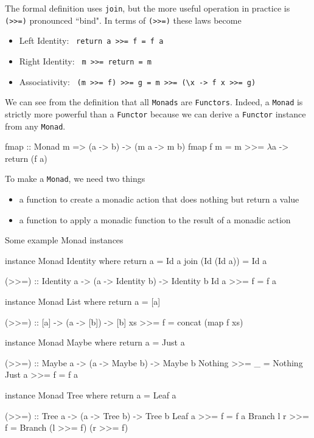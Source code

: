 \documentclass[12pt]{article}
\begin{document}
The formal definition uses \texttt{join}, but the more useful operation in practice is
\texttt{(>>=)} pronounced ``bind". In terms of \texttt{(>>=)} these laws become
\begin{itemize}
    \item{Left Identity: \lstinline $ return a >>= f = f a $}
    \item{Right Identity: \lstinline $ m >>= return = m $}
    \item{Associativity: \lstinline $ (m >>= f) >>= g = m >>= (\x -> f x >>= g) $}
\end{itemize}

We can see from the definition that all \texttt{Monads} are \texttt{Functors}.
Indeed, a \texttt{Monad} is strictly more powerful than a \texttt{Functor} because
we can derive a \texttt{Functor} instance from any \texttt{Monad}.
\begin{haskell}
fmap :: Monad m => (a -> b) -> (m a -> m b)
fmap f m = m >>= $\lambda$a -> return (f a)
\end{haskell}
\newpage

To make a \texttt{Monad}, we need two things
\begin{itemize}
    \item{a function to create a monadic action that does nothing but return a value}
    \item{a function to apply a monadic function to the result of a monadic action}
\end{itemize}

Some example Monad instances
\begin{haskell}
instance Monad Identity where
    return a = Id a
    join (Id (Id a)) = Id a

    (>>=) :: Identity a -> (a -> Identity b) -> Identity b
    Id a >>= f = f a

instance Monad List where
    return a = [a]

    (>>=) :: [a] -> (a -> [b]) -> [b]
    xs >>= f = concat (map f xs)

instance Monad Maybe where
    return a = Just a

    (>>=) :: Maybe a -> (a -> Maybe b) -> Maybe b
    Nothing >>= _ = Nothing
    Just a  >>= f = f a

instance Monad Tree where
    return a = Leaf a

    (>>=) :: Tree a -> (a -> Tree b) -> Tree b
    Leaf a >>= f = f a
    Branch l r >>= f = Branch (l >>= f) (r >>= f)
\end{haskell}
\end{document}
